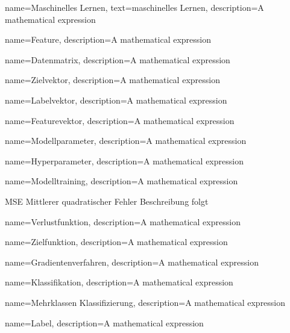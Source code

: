
{
        name=Maschinelles Lernen,
        text=maschinelles Lernen,
        description={A mathematical expression}
}

{
        name=Feature,
        description={A mathematical expression}
}

{
        name=Datenmatrix,
        description={A mathematical expression}
}

{
        name=Zielvektor,
        description={A mathematical expression}
}

{
        name=Labelvektor,
        description={A mathematical expression}
}

{
        name=Featurevektor,
        description={A mathematical expression}
}

{
        name=Modellparameter,
        description={A mathematical expression}
}

{
        name=Hyperparameter,
        description={A mathematical expression}
}

{
        name=Modelltraining,
        description={A mathematical expression}
}

\newglossaryentrywithacronym
{MSE}
{Mittlerer quadratischer Fehler}
{Beschreibung folgt}

{
        name=Verlustfunktion,
        description={A mathematical expression}
}

{
        name=Zielfunktion,
        description={A mathematical expression}
}

{
        name=Gradientenverfahren,
        description={A mathematical expression}
}

{
        name=Klassifikation,
        description={A mathematical expression}
}

{
        name=Mehrklassen Klassifizierung,
        description={A mathematical expression}
}

{
        name=Label,
        description={A mathematical expression}
}

